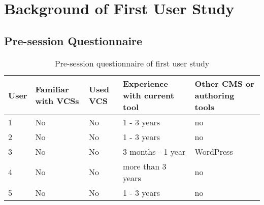\chapter{Background of First User Study}
\label{sec:first-iteration-scenarios}


\section{Pre-session Questionnaire} \label{append:presession-quest-1}

\begin{table}[h!]
\centering
\begin{tabular}{|l|p{3.5cm}|p{1.5cm}|p{3.5cm}|p{3.5cm}|}
\hline
\rowcolor[HTML]{EFEFEF}
\textbf{User} & \textbf{Familiar with VCSs} & \textbf{Used VCS} & \textbf{Experience with current tool} & \textbf{Other CMS or authoring tools} \\ \hline
1 & No & No & 1 - 3 years & no \\ \hline
2 & No & No & 1 - 3 years & no \\ \hline
3 & No & No & 3 months - 1 year & WordPress \\ \hline
4 & No & No & more than 3 years & no \\ \hline
5 & No & No & 1 - 3 years & no \\ \hline
\end{tabular}
\caption{Pre-session questionnaire of first user study}
\label{table:pre-sess-quest}
\end{table}
